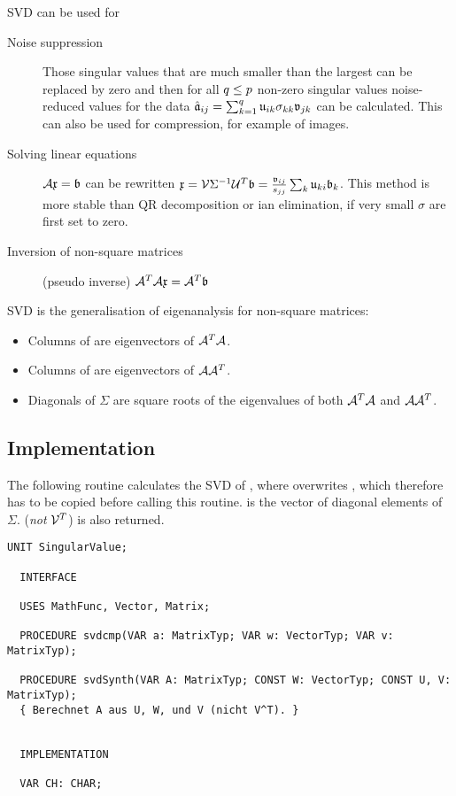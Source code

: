 SVD can be used for
\begin{description}
  \item[Noise suppression]{Those singular values that are much smaller than the largest can be replaced by zero and then for all \(q \leq p \) non-zero singular values noise-reduced values for the data \(\hat{\mathfrak{a}}_{ij} = \sum_{k=1}^q{\mathfrak{u}_{ik} \sigma_{kk} \mathfrak{v}_{jk}} \) can be calculated. This can also be used for compression, for example of images.}
  \item[Solving linear equations]{\( \mathcal{A}\mathfrak{x} = \mathfrak{b} \) can be rewritten \(\mathfrak{x} = \mathcal{V}\Sigma^{-1}\mathcal{U}^T \mathfrak{b} = \frac{\mathfrak{v}_{ij}}{s_{jj}} \sum_{k}{\mathfrak{u}_{ki} \mathfrak{b}_k} \). This method is more stable than QR decomposition or ian elimination, if very small \(\sigma \) are first set to zero.  }
  \item[Inversion of non-square matrices]{(pseudo inverse) \(\mathcal{A}^T\mathcal{A}\mathfrak{x} = \mathcal{A}^T\mathfrak{b} \)}
\end{description}

SVD is the generalisation of eigenanalysis for non-square matrices:
\begin{itemize}
  \item{Columns of  are eigenvectors of \(\mathcal{A}^T\mathcal{A} \).}
  \item{Columns of  are eigenvectors of \(\mathcal{A}\mathcal{A}^T \).}
  \item{Diagonals of \(\Sigma \) are square roots of the eigenvalues of both \(\mathcal{A}^T\mathcal{A} \) and \(\mathcal{A}\mathcal{A}^T \).}
\end{itemize}


\subsection{Implementation}

The following routine \parencite{Pre-89} calculates the SVD of , where  overwrites , which therefore has to be copied before calling this routine.  is the vector of diagonal elements of \(\Sigma \).  (\emph{not} \(\mathcal{V}^T \)) is also returned.

\begin{lstlisting}[caption={Interface of unit SingularValue}]
  UNIT SingularValue;

  INTERFACE

  USES MathFunc, Vector, Matrix;

  PROCEDURE svdcmp(VAR a: MatrixTyp; VAR w: VectorTyp; VAR v: MatrixTyp);

  PROCEDURE svdSynth(VAR A: MatrixTyp; CONST W: VectorTyp; CONST U, V: MatrixTyp);
  { Berechnet A aus U, W, und V (nicht V^T). }


  IMPLEMENTATION

  VAR CH: CHAR;
\end{lstlisting}


